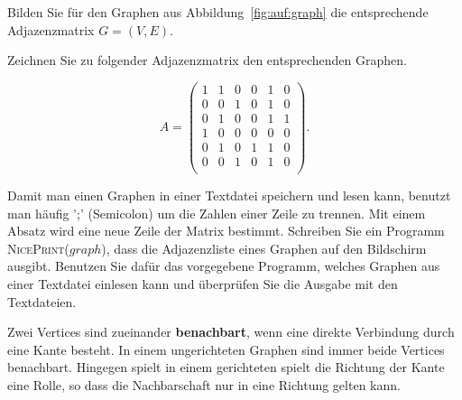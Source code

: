 \begin{aufg}
Bilden Sie für den Graphen aus Abbildung~\ref{fig:auf:graph} die entsprechende Adjazenzmatrix $G=(V,E)$.
\end{aufg}



\begin{aufg}
Zeichnen Sie zu folgender Adjazenzmatrix den entsprechenden Graphen.


\[A =  \begin{pmatrix}
  1 & 1 & 0 & 0 & 1 & 0 \\
  0 & 0 & 1 & 0 & 1 & 0 \\
  0 & 1 & 0 & 0 & 1 & 1 \\
  1 & 0 & 0 & 0 & 0 & 0 \\
  0 & 1 & 0 & 1 & 1 & 0 \\
  0 & 0 & 1 & 0 & 1 & 0 \\
 \end{pmatrix}.
  \]
  
\end{aufg}

\begin{aufg}
Damit man einen Graphen in einer Textdatei speichern und lesen kann, benutzt man häufig ';' (Semicolon) um die Zahlen einer Zeile zu trennen. 
Mit einem Absatz wird eine neue Zeile der Matrix bestimmt. 
Schreiben Sie ein Programm \textsc{NicePrint($graph$)}, dass die Adjazenzliste eines Graphen auf den Bildschirm ausgibt.
Benutzen Sie dafür das vorgegebene Programm, welches Graphen aus einer Textdatei einlesen kann und überprüfen Sie die Ausgabe mit den Textdateien.
\end{aufg}


\begin{mdef}
Zwei Vertices sind zueinander \textbf{benachbart}, wenn eine direkte Verbindung durch eine Kante besteht. 
In einem ungerichteten Graphen sind immer beide Vertices benachbart. 
Hingegen spielt in einem gerichteten spielt die Richtung der Kante eine Rolle, so dass die Nachbarschaft nur in eine Richtung gelten kann.
\end{mdef}


